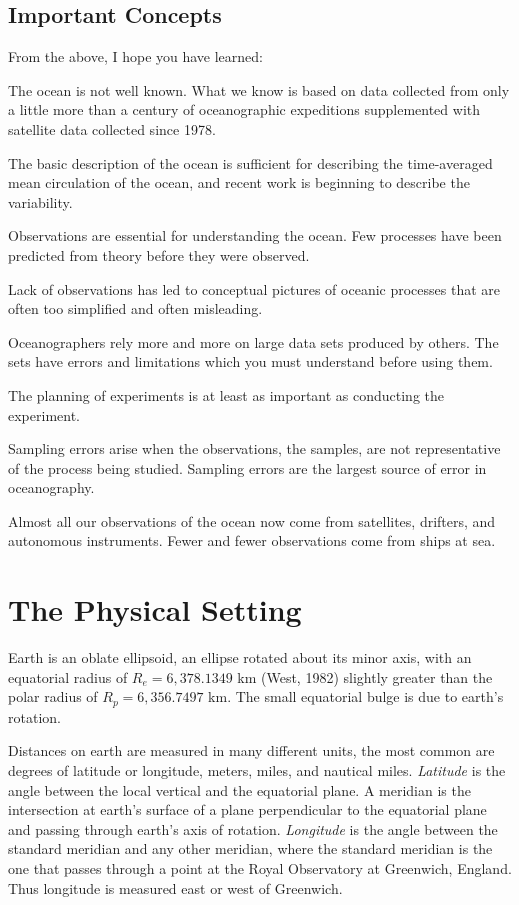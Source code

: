 \section{Important Concepts}
From the above, I hope you have learned:
\begin{enumerate}
\vitem The ocean is not well known. What we know is based on data
collected from only a little more than a century of oceanographic
expeditions supplemented with satellite data collected since 1978.

\vitem The basic description of the ocean is sufficient for describing
the time-averaged mean circulation of the ocean, and recent work is
beginning to describe the variability.

\vitem Observations are essential for understanding the ocean. Few
processes have been predicted from theory before they were observed.

\vitem Lack of observations has led to conceptual pictures of oceanic
processes that are often too simplified and often misleading.

\vitem Oceanographers rely more and more on large data sets produced
by others.  The sets have errors and limitations which you must
understand before using them.

\vitem The planning of experiments is at least as important as
conducting the experiment.

\vitem Sampling errors arise when the observations, the samples, are
not representative of the process being studied. Sampling errors are
the largest source of error in oceanography.

\vitem Almost all our observations of the ocean now come from
satellites, drifters, and autonomous instruments. Fewer and fewer
observations come from ships at sea.
\end{enumerate}

\chapter{The Physical Setting}
\addtocounter{figure}{1}

Earth is an oblate ellipsoid, an ellipse rotated
about its minor axis, with an equatorial radius of $R_e = 6,378.1349$
km (West, 1982) slightly greater than the polar radius of $R_p =
6,356.7497$ km. The small equatorial bulge is due to earth's rotation.

Distances on earth are measured in many different units, the most
common are degrees of latitude or longitude, meters, miles, and
nautical miles.  \textit{Latitude} is the angle
between the local vertical and the equatorial plane. A meridian is the
intersection at earth's surface of a plane perpendicular to the
equatorial plane and passing through earth's axis of rotation.
\textit{Longitude} is the angle between the
standard meridian and any other meridian, where the standard meridian
is the one that passes through a point at the Royal Observatory at
Greenwich, England.  Thus longitude is measured east or west of
Greenwich.

